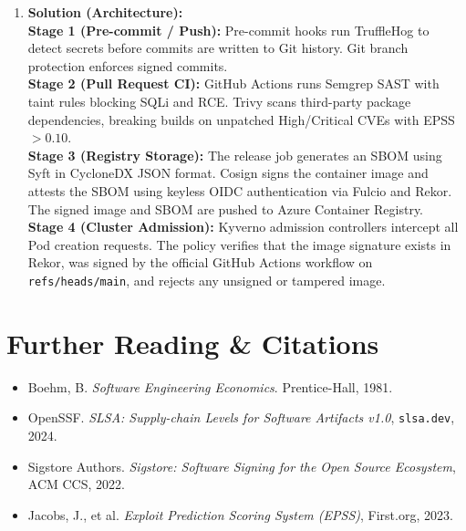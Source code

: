 \begin{enumerate}[leftmargin=18pt]
  \item \textbf{Solution (Architecture):}\\
  \textbf{Stage 1 (Pre-commit / Push):} Pre-commit hooks run TruffleHog to detect secrets before commits are written to Git history. Git branch protection enforces signed commits.\\
  \textbf{Stage 2 (Pull Request CI):} GitHub Actions runs Semgrep SAST with taint rules blocking SQLi and RCE. Trivy scans third-party package dependencies, breaking builds on unpatched High/Critical CVEs with EPSS $> 0.10$.\\
  \textbf{Stage 3 (Registry Storage):} The release job generates an SBOM using Syft in CycloneDX JSON format. Cosign signs the container image and attests the SBOM using keyless OIDC authentication via Fulcio and Rekor. The signed image and SBOM are pushed to Azure Container Registry.\\
  \textbf{Stage 4 (Cluster Admission):} Kyverno admission controllers intercept all Pod creation requests. The policy verifies that the image signature exists in Rekor, was signed by the official GitHub Actions workflow on \texttt{refs/heads/main}, and rejects any unsigned or tampered image.
\end{enumerate}

\section{Further Reading \& Citations}
\begin{itemize}[leftmargin=15pt]
  \item Boehm, B. \emph{Software Engineering Economics}. Prentice-Hall, 1981.
  \item OpenSSF. \emph{SLSA: Supply-chain Levels for Software Artifacts v1.0}, \texttt{slsa.dev}, 2024.
  \item Sigstore Authors. \emph{Sigstore: Software Signing for the Open Source Ecosystem}, ACM CCS, 2022.
  \item Jacobs, J., et al. \emph{Exploit Prediction Scoring System (EPSS)}, First.org, 2023.
\end{itemize}

